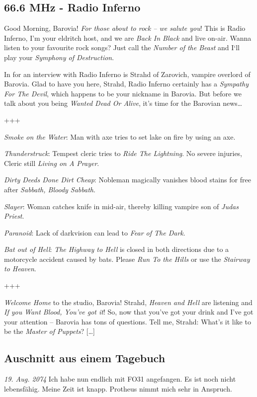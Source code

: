 \documentclass[final]{multiversum}
\begin{document}

\subsection{66.6 MHz - Radio Inferno}
Good Morning, Barovia! \textit{For those about to rock – we salute you}! This is Radio Inferno, I’m your eldritch host, and we are \textit{Back In Black} and live on-air. Wanna listen to your favourite rock songs? Just call the \textit{Number of the Beast} and I‘ll play your \textit{Symphony of Destruction}.

In for an interview with Radio Inferno is Strahd of Zarovich, vampire overlord of Barovia. Glad to have you here, Strahd, Radio Inferno certainly has a \textit{Sympathy For The Devil}, which happens to be your nickname in Barovia. But before we talk about you being \textit{Wanted Dead Or Alive}, it’s time for the Barovian news…

\centerline { +++ }

\textit{Smoke on the Water}: Man with axe tries to set lake on fire by using an axe.

\textit{Thunderstruck}: Tempest cleric tries to \textit{Ride The Lightning}. No severe injuries, Cleric still \textit{Living on A Prayer}.

\textit{Dirty Deeds Done Dirt Cheap}: Nobleman magically vanishes blood stains for free after \textit{Sabbath, Bloody Sabbath}.

\textit{Slayer}: Woman catches knife in mid-air, thereby killing vampire son of \textit{Judas Priest}.

\textit{Paranoid}: Lack of darkvision can lead to \textit{Fear of The Dark}.

\textit{Bat out of Hell}: \textit{The Highway to Hell} is closed in both directions due to a motorcycle accident caused by bats. Please \textit{Run To the Hills} or use the \textit{Stairway to Heaven}.

\centerline { +++ }

\textit{Welcome Home} to the studio, Barovia! Strahd, \textit{Heaven and Hell} are listening and \textit{If you Want Blood, You’ve got it}! So, now that you’ve got your drink and I’ve got your attention – Barovia has tons of questions. Tell me, Strahd: What's it like to be the \textit{Master of Puppets}? […]


\subsection{Auschnitt aus einem Tagebuch}
\textit{19. Aug. 2074} Ich habe nun endlich mit FO31 angefangen. Es ist noch nicht lebensfähig. Meine Zeit ist knapp.  Protheus nimmt mich sehr in Anspruch. 
\end{document}
